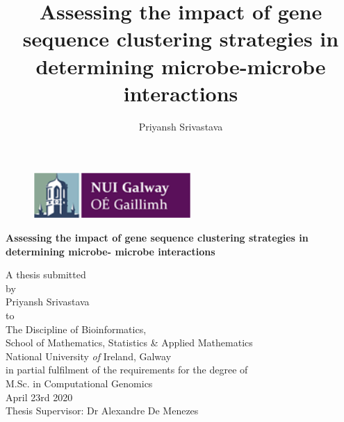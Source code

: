 \documentclass[a4paper, 12pt]{report}
\title{Assessing the impact of gene sequence clustering strategies in
determining microbe-microbe interactions}
\author{Priyansh Srivastava}
\begin{document}
\begin{titlepage}
\setlength{\topmargin}{-0.6in}

\begin{figure}[!h]
  \centering
  \includegraphics[width=6cm]{logo.png}
\end{figure}
\vspace{1cm}

\begin{center}
{\LARGE \bigskip\textbf{Assessing the impact of gene sequence clustering strategies in determining microbe-
microbe interactions}}

\vspace{1.25cm}
{\normalsize A thesis submitted \vspace{.5cm}\\ by \vspace{.5cm}\\
\vspace{1.25cm} Priyansh Srivastava \vspace{1.25cm} \\ to \vspace{.5cm} \\
The Discipline of Bioinformatics, \\ School of Mathematics, Statistics \& Applied Mathematics \\ National University \textit{of} Ireland, Galway \vspace{1cm} \\ in partial fulfilment of
the requirements for the degree of \\ \vspace{.5cm} M.Sc. in
Computational Genomics \vspace{1cm} \\ April 23rd 2020 \\
\vspace{1.25cm} Thesis Supervisor: Dr Alexandre De Menezes}

\end{center}
\end{titlepage}




 \setcounter{page}{2}
\tableofcontents
\newpage

\listoffigures
\listoftables













%
\end{document}
